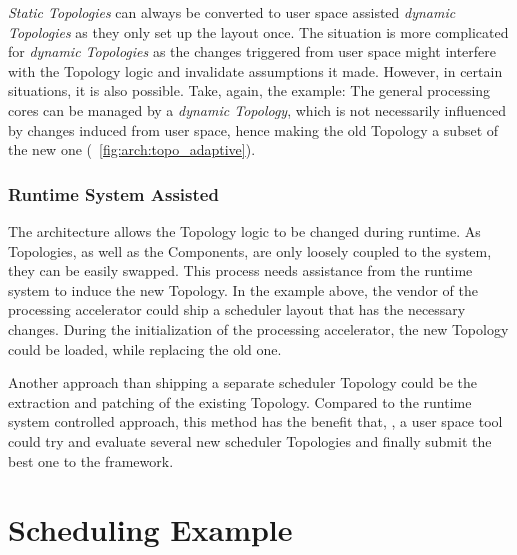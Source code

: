 \emph{Static Topologies} can always be converted to user space assisted \emph{dynamic Topologies} as they only set up the \cobas{} layout once. The situation is more complicated for \emph{dynamic Topologies} as the changes triggered from user space might interfere with the Topology logic and invalidate assumptions it made. However, in certain situations, it is also possible. Take, again, the example: The general processing cores can be managed by a \emph{dynamic Topology}, which is not necessarily influenced by changes induced from user space, hence making the old Topology a subset of the new one (\cf{}~\cref{fig:arch:topo_adaptive}).

\subsubsection{Runtime System Assisted}

The \cobas{} architecture allows the Topology logic to be changed during runtime. As Topologies, as well as the Components, are only loosely coupled to the system, they can be easily swapped. This process needs assistance from the runtime system to induce the new Topology. In the example above, the vendor of the processing accelerator could ship a scheduler layout that has the necessary changes. During the initialization of the processing accelerator, the new Topology could be loaded, while replacing the old one.

Another approach than shipping a separate scheduler Topology could be the extraction and patching of the existing Topology. Compared to the runtime system controlled approach, this method has the benefit that, \eg{}, a user space tool could try and evaluate several new scheduler Topologies and finally submit the best one to the framework.

\section{Scheduling Example}%
\label{sec:arch:example}

